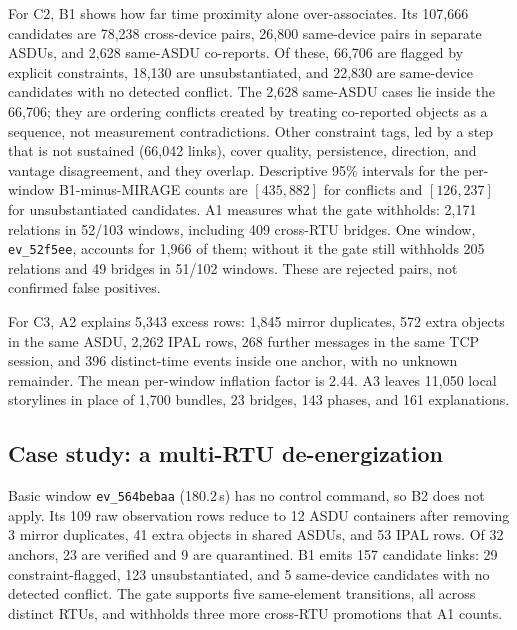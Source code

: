 \documentclass[conference]{IEEEtran}
\begin{document}
For C2, B1 shows how far time proximity alone over-associates.
Its 107{,}666 candidates are 78{,}238 cross-device pairs, 26{,}800 same-device pairs in separate ASDUs, and 2{,}628 same-ASDU co-reports.
Of these, 66{,}706 are flagged by explicit constraints, 18{,}130 are unsubstantiated, and 22{,}830 are same-device candidates with no detected conflict.
The 2{,}628 same-ASDU cases lie inside the 66{,}706; they are ordering conflicts created by treating co-reported objects as a sequence, not measurement contradictions.
Other constraint tags, led by a step that is not sustained (66{,}042 links), cover quality, persistence, direction, and vantage disagreement, and they overlap.
Descriptive 95\% intervals for the per-window B1-minus-MIRAGE counts are $[435, 882]$ for conflicts and $[126, 237]$ for unsubstantiated candidates.
A1 measures what the gate withholds: 2{,}171 relations in 52/103 windows, including 409 cross-RTU bridges.
One window, \texttt{ev\_52f5ee}, accounts for 1{,}966 of them; without it the gate still withholds 205 relations and 49 bridges in 51/102 windows.
These are rejected pairs, not confirmed false positives.

For C3, A2 explains 5{,}343 excess rows: 1{,}845 mirror duplicates, 572 extra objects in the same ASDU, 2{,}262 IPAL rows, 268 further messages in the same TCP session, and 396 distinct-time events inside one anchor, with no unknown remainder.
The mean per-window inflation factor is 2.44.
A3 leaves 11{,}050 local storylines in place of 1{,}700 bundles, 23 bridges, 143 phases, and 161 explanations.

\subsection{Case study: a multi-RTU de-energization}
\label{sec:case}
Basic window \texttt{ev\_564bebaa} (180.2\,s) has no control command, so B2 does not apply.
Its 109 raw observation rows reduce to 12 ASDU containers after removing 3 mirror duplicates, 41 extra objects in shared ASDUs, and 53 IPAL rows.
Of 32 anchors, 23 are verified and 9 are quarantined.
B1 emits 157 candidate links: 29 constraint-flagged, 123 unsubstantiated, and 5 same-device candidates with no detected conflict.
The gate supports five same-element transitions, all across distinct RTUs, and withholds three more cross-RTU promotions that A1 counts.
\end{document}
